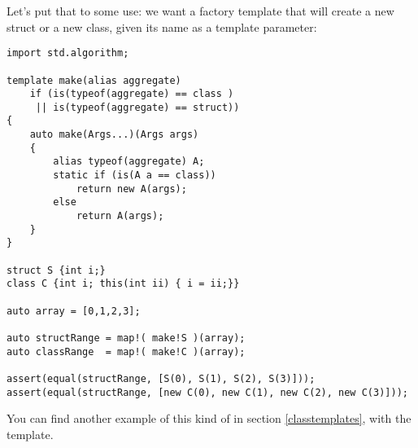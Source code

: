 Let's put that to some use: we want a factory template that will create a new struct or a new class, given its name as a template parameter:

\begin{verbatim}
import std.algorithm;

template make(alias aggregate) 
    if (is(typeof(aggregate) == class ) 
     || is(typeof(aggregate) == struct))
{
    auto make(Args...)(Args args)
    {
        alias typeof(aggregate) A;        
        static if (is(A a == class))
            return new A(args);
        else
            return A(args);
    }
}

struct S {int i;}
class C {int i; this(int ii) { i = ii;}}

auto array = [0,1,2,3];

auto structRange = map!( make!S )(array);
auto classRange  = map!( make!C )(array);

assert(equal(structRange, [S(0), S(1), S(2), S(3)]));
assert(equal(structRange, [new C(0), new C(1), new C(2), new C(3)]));
\end{verbatim}

You can find another example of this kind of  in section \ref{classtemplates}, with the  template.
